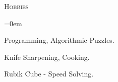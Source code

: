 \documentclass[11pt]{article}
\begin{document}
\vspace{0.12in}

\noindent
\textcolor{Primary}{{\large \textsc{Hobbies}}}
\begin{list}{}{\leftmargin=0em}
  \setlength{\itemsep}{1pt}
  \setlength{\parskip}{0pt}
  \setlength{\parsep}{0pt}
  \item{Programming, Algorithmic Puzzles.}
  \item{Knife Sharpening, Cooking.}
  \item{Rubik Cube - Speed Solving.}
\end{list}
\end{document}
